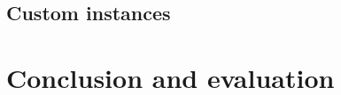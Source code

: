 \documentclass{article}
\begin{document}
\subsection{Custom instances}


\section{Conclusion and evaluation}

\end{document}
